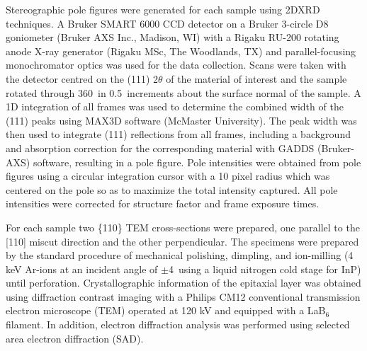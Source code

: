 Stereographic pole figures were generated for each sample using 2DXRD techniques. A Bruker SMART 6000 CCD detector on a Bruker 3-circle D8 goniometer (Bruker AXS Inc., Madison, WI) with a Rigaku RU-200 rotating anode X-ray generator (Rigaku MSc, The Woodlands, TX) and parallel-focusing monochromator optics was used for the data collection. Scans were taken with the detector centred on the (111) 2$\theta$ of the material of interest and the sample rotated through 360\degree~in 0.5\degree~increments about the surface normal of the sample. A 1D integration of all frames was used to determine the combined width of the (111) peaks using MAX3D software (McMaster University)\cite{Britten2007}. The peak width was then used to integrate (111) reflections from all frames, including a background and absorption correction for the corresponding material with GADDS (Bruker-AXS) software, resulting in a pole figure. Pole intensities were obtained from pole figures using a circular integration cursor with a 10 pixel radius which was centered on the pole so as to maximize the total intensity captured. All pole intensities were corrected for structure factor and frame exposure times.

For each sample two \{110\} TEM cross-sections were prepared, one parallel to the [110] miscut direction and the other perpendicular. The specimens were prepared by the standard procedure of mechanical polishing, dimpling, and ion-milling (4 keV Ar-ions at an incident angle of $\pm$4\degree~using a liquid nitrogen cold stage for InP) until perforation. Crystallographic information of the epitaxial layer was obtained using diffraction contrast imaging with a Philips CM12 conventional transmission electron microscope (TEM) operated at 120 kV and equipped with a LaB$_6$ filament. In addition, electron diffraction analysis was performed using selected area electron diffraction (SAD).
